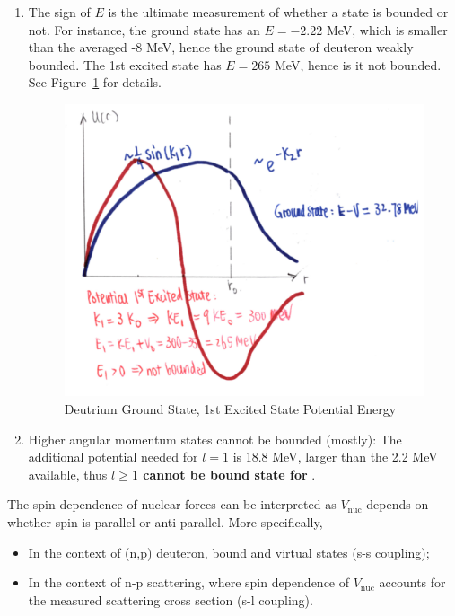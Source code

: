 \documentclass{school-22.101-notes}
\begin{document}
\begin{enumerate}
\item The sign of $E$ is the ultimate measurement of whether a state is bounded or not. For instance, the ground state has an $E = -2.22 $ MeV, which is smaller than the averaged -8 MeV, hence the ground state of deuteron weakly bounded. The 1st excited state has $E = 265$ MeV, hence is it not bounded. See Figure~\ref{deuteron-bound} for details. 

\begin{figure}
    \centering
    \includegraphics[width=5in]{images/deuteron/deuteron-states.png}
    \caption{Deutrium Ground State, 1st Excited State Potential Energy}    \label{deuteron-bound}
\end{figure}

\item Higher angular momentum states cannot be bounded (mostly):
The additional potential needed for $l=1$ is 18.8 MeV, larger than the 2.2 MeV available, thus \textbf{$l \ge 1$ cannot be bound state for }. 
\end{enumerate}


The spin dependence of nuclear forces can be interpreted as $V_{\mathrm{nuc}}$ depends on whether spin is parallel or anti-parallel. More specifically, 
\begin{itemize}
    \item In the context of (n,p) deuteron, bound and virtual states (s-s coupling);
    \item In the context of n-p scattering, where spin dependence of $V_{\mathrm{nuc}}$ accounts for the measured scattering cross section (s-l coupling). 
\end{itemize}
\end{document}
